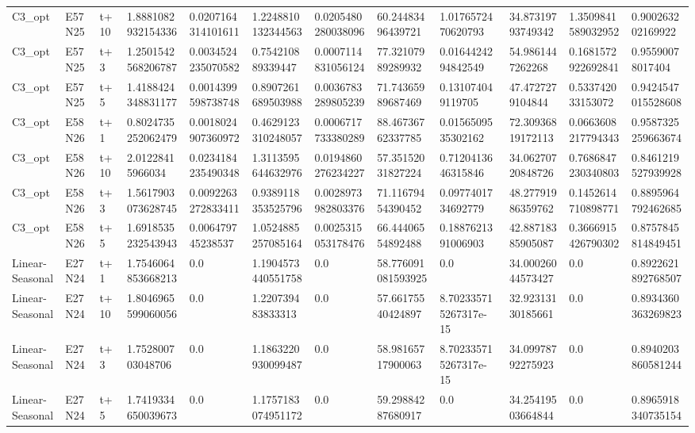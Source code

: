 \begin{landscape}
\begin{longtable}{llllllllllll}
C3\_opt & E57N25 & t+10 & 1.8881082932154336 & 0.0207164314101611 & 1.2248810132344563 & 0.0205480280038096 & 60.24483496439721 & 1.0176572470620793 & 34.87319793749342 & 1.3509841589032952 & 0.900263202169922 \\
C3\_opt & E57N25 & t+3 & 1.2501542568206787 & 0.0034524235070582 & 0.754210889339447 & 0.0007114831056124 & 77.32107989289932 & 0.0164424294842549 & 54.9861447262268 & 0.1681572922692841 & 0.95590078017404 \\
C3\_opt & E57N25 & t+5 & 1.4188424348831177 & 0.0014399598738748 & 0.8907261689503988 & 0.0036783289805239 & 71.74365989687469 & 0.131074049119705 & 47.4727279104844 & 0.533742033153072 & 0.9424547015528608 \\
C3\_opt & E58N26 & t+1 & 0.8024735252062479 & 0.0018024907360972 & 0.4629123310248057 & 0.0006717733380289 & 88.46736762337785 & 0.0156509535302162 & 72.30936819172113 & 0.0663608217794343 & 0.9587325259663674 \\
C3\_opt & E58N26 & t+10 & 2.01228415966034 & 0.0234184235490348 & 1.3113595644632976 & 0.0194860276234227 & 57.35152031827224 & 0.7120413646315846 & 34.06270720848726 & 0.7686847230340803 & 0.8461219527939928 \\
C3\_opt & E58N26 & t+3 & 1.5617903073628745 & 0.0092263272833411 & 0.9389118353525796 & 0.0028973982803376 & 71.11679454390452 & 0.0977401734692779 & 48.27791986359762 & 0.1452614710898771 & 0.8895964792462685 \\
C3\_opt & E58N26 & t+5 & 1.6918535232543943 & 0.006479745238537 & 1.0524885257085164 & 0.0025315053178476 & 66.44406554892488 & 0.1887621391006903 & 42.88718385905087 & 0.3666915426790302 & 0.8757845814849451 \\
Linear-Seasonal & E27N24 & t+1 & 1.7546064853668213 & 0.0 & 1.1904573440551758 & 0.0 & 58.776091081593925 & 0.0 & 34.00026044573427 & 0.0 & 0.8922621892768507 \\
Linear-Seasonal & E27N24 & t+10 & 1.8046965599060056 & 0.0 & 1.220739483833313 & 0.0 & 57.66175540424897 & 8.702335715267317e-15 & 32.92313130185661 & 0.0 & 0.8934360363269823 \\
Linear-Seasonal & E27N24 & t+3 & 1.752800703048706 & 0.0 & 1.1863220930099487 & 0.0 & 58.98165717900063 & 8.702335715267317e-15 & 34.09978792275923 & 0.0 & 0.8940203860581244 \\
Linear-Seasonal & E27N24 & t+5 & 1.7419334650039673 & 0.0 & 1.1757183074951172 & 0.0 & 59.29884287680917 & 0.0 & 34.25419503664844 & 0.0 & 0.8965918340735154 \\

\end{longtable}
\end{landscape}
